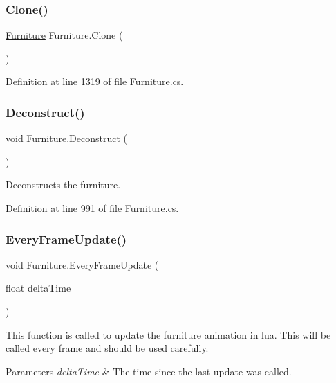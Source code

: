 \subsubsection{\texorpdfstring{Clone()}{Clone()}}
{\footnotesize\ttfamily \hyperlink{class_furniture}{Furniture} Furniture.\+Clone (\begin{DoxyParamCaption}{ }\end{DoxyParamCaption})}



Definition at line 1319 of file Furniture.\+cs.

\mbox{\label{class_furniture_a7ca16a3c95b1bf9b3d3f60c543e691b5}} 
\subsubsection{\texorpdfstring{Deconstruct()}{Deconstruct()}}
{\footnotesize\ttfamily void Furniture.\+Deconstruct (\begin{DoxyParamCaption}{ }\end{DoxyParamCaption})}



Deconstructs the furniture. 



Definition at line 991 of file Furniture.\+cs.

\mbox{\label{class_furniture_ad44ee227637d74afa5636c9610ec8dbc}} 
\subsubsection{\texorpdfstring{Every\+Frame\+Update()}{EveryFrameUpdate()}}
{\footnotesize\ttfamily void Furniture.\+Every\+Frame\+Update (\begin{DoxyParamCaption}\item[{float}]{delta\+Time }\end{DoxyParamCaption})}



This function is called to update the furniture animation in lua. This will be called every frame and should be used carefully. 


\begin{DoxyParams}{Parameters}
{\em delta\+Time} & The time since the last update was called.\\
\hline
\end{DoxyParams}


